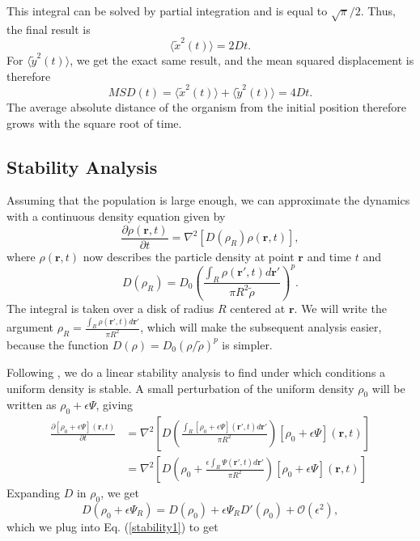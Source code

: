 \documentclass{article}
\renewcommand{\vec}[1]{\boldsymbol{#1}}
\begin{document}
This integral can be solved by partial integration and is equal to $\sqrt{\pi}/2$.
Thus, the final result is 
\begin{equation*}
    \langle \tilde{x}^2(t)\rangle = 2Dt.
\end{equation*}
For $\langle \tilde{y}^2(t)\rangle$, we get the exact same result, and the mean squared displacement is therefore
\begin{equation*}
    MSD(t) = \langle \tilde{x}^2(t)\rangle + \langle \tilde{y}^2(t)\rangle  = 4Dt.
\end{equation*}
The average absolute distance of the organism from the initial position therefore grows with the square root of time.



\subsection{Stability Analysis}
Assuming that the population is large enough, we can approximate the dynamics with a continuous density equation given by
\begin{equation}
    \frac{\partial\rho(\vec{r},t)}{\partial t} = \nabla^2[D(\rho_R)\rho(\vec{r},t)],
\end{equation}
where $\rho(\vec{r},t)$ now describes the particle density at point $\vec{r}$ and time $t$ and
\begin{equation}
    D(\rho_R) = D_0 \left(\frac{\int_{R} \rho(\vec{r}',t)d\vec{r}'}{\pi R^2 \tilde{\rho}}\right)^p.
\end{equation}
The integral is taken over a disk of radius $R$ centered at $\vec{r}$. 
We will write the argument $\rho_R = \frac{\int_{R} \rho(\vec{r}',t)d\vec{r}'}{\pi R^2}$, which will make the subsequent analysis easier, because the function $D(\rho)=D_0 (\rho/\tilde{\rho})^p$ is simpler.

Following \cite{lopezMacroscopicDescriptionParticle2006}, we do a linear stability analysis to find under which conditions a uniform density is stable. 
A small perturbation of the uniform density $\rho_0$ will be written as $\rho_0 + \epsilon \Psi$, giving
\begin{align}
    \frac{\partial[\rho_0 + \epsilon \Psi](\vec{r},t)}{\partial t} &= \nabla^2\left[D\left(\frac{\int_{R} [\rho_0+\epsilon \Psi](\vec{r}',t)d\vec{r}'}{\pi R^2}\right)[\rho_0+\epsilon \Psi](\vec{r},t)\right]\\
    &= \nabla^2\left[D\left(\rho_0+\frac{\epsilon\int_{R} \Psi(\vec{r}',t)d\vec{r}'}{\pi R^2}\right)[\rho_0+\epsilon \Psi](\vec{r},t)\right] \label{stability1}
\end{align}
Expanding $D$ in $\rho_0$, we get 
\begin{equation}
    D(\rho_0+\epsilon \Psi_R) = D(\rho_0) + \epsilon \Psi_R D'(\rho_0) + \mathcal{O}(\epsilon^2),
\end{equation}
which we plug into Eq. (\ref{stability1}) to get
\end{document}
